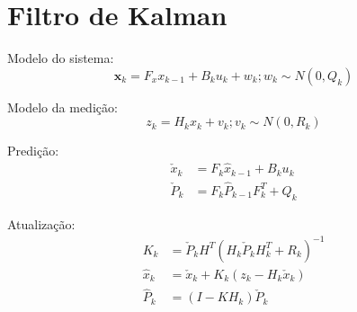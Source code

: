 \section{Filtro de Kalman}

Modelo do sistema:
\begin{equation}
\textbf{x}_k = F_x x_{k-1} + B_k u_k + w_k; w_k \sim N(0, Q_k)
\end{equation}

Modelo da medição:
\begin{equation}
z_k = H_k x_k + v_k; v_k \sim N(0, R_k)
\end{equation}

Predição:
\begin{align*}
    \check{x}_k &= F_k \hat{x}_{k-1} + B_k u_k\\
    \check{P}_k &= F_k \hat{P}_{k-1} F^T_k + Q_k
\end{align*}

Atualização:
\begin{align*}
    K_k &= \check{P}_k H^T \left( H_k \check{P}_k H^T_k + R_k\right)^{-1}\\
    \hat{x}_k &= \check{x}_k + K_k\left( z_k - H_k \check{x}_k \right)\\
    \hat{P}_k &= \left(I - KH_k \right)\check{P}_k
\end{align*}